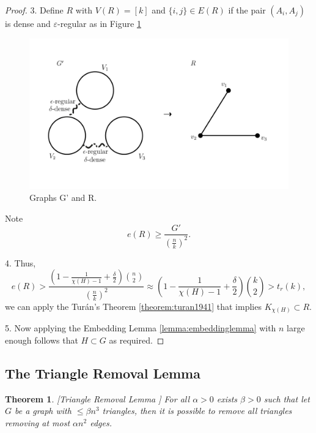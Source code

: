 \documentclass[12pt,twoside,a4paper,bibliography=totocnumbered]{book}
\numberwithin{equation}{section}
\newtheorem{theorem}             {Theorem}[section]
\theoremstyle{remark}
\begin{document}
\begin{proof}
3. Define $R$ with $V(R) = [k]$ and $\{i,j\} \in E(R) $ if  the pair $(A_i, A_j)$ is dense and $\varepsilon$-regular as in Figure \ref{fig:graph-G'-and-R}

\begin{figure}[H]
     \centering
     \includegraphics[scale=1.5]{Figuras/graph-G'-and-R.jpg}
     \caption{Graphs G' and R.}
     \label{fig:graph-G'-and-R}
\end{figure}

Note 
$$e(R) \geq \frac{G'}{\left(\frac{n}{k}\right)^2}.$$

4. Thus,
$$e(R) > \frac{\left(1 - \frac{1}{\chi(H) - 1} + \frac{\delta}{2}\right) \binom{n}{2}}{\left(\frac{n}{k}\right)^2} \approx \left( 1 - \frac{1}{\chi(H) - 1} + \frac{\delta}{2}\right) \binom{k}{2}> t_r(k),$$
we can apply the Turán's Theorem \ref{theorem:turan1941} that implies $K_{\chi (H)} \subset R$.

5. Now applying the Embedding Lemma \ref{lemma:embeddinglemma} with $n$ large enough follows that $H \subset G$ as required.

\end{proof}

\subsection{The Triangle Removal Lemma}
\begin{theorem}\label{lemma:triangleremoval}[{Triangle Removal Lemma \cite{RuSz76}}]
For all $\alpha > 0$ exists $\beta > 0$ such that let $G$ be a graph with $\leq \beta n^3$ triangles, then it is possible to remove all triangles removing at most $\alpha n^2$ edges. 
\end{theorem}
\end{document}
